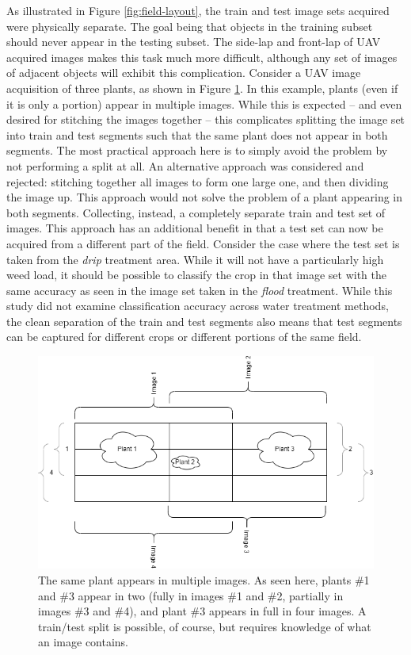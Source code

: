 \documentclass[letterpaper]{report}
\begin{document}
As illustrated in Figure \ref{fig:field-layout}, the train and test image sets acquired were physically separate. The goal being that objects in the training subset should never appear in the testing subset. The side-lap and front-lap of UAV acquired images makes this task much more difficult, although any set of images of adjacent objects will exhibit this complication. Consider a UAV image acquisition of three plants, as shown in Figure \ref{fig:uav-overlap}. In this example, plants (even if it is only a portion) appear in multiple images. While this is expected -- and even desired for stitching the images together -- this complicates splitting the image set into train and test segments such that the same plant does not appear in both segments. The most practical approach here is to simply avoid the problem by not performing a split at all. An alternative approach was considered and rejected: stitching together all images to form one large one, and then dividing the image up. This approach would not solve the problem of a plant appearing in both segments. Collecting, instead, a completely separate train and test set of images. This approach has an additional benefit in that a test set can now be acquired from a different part of the field. Consider the case where the test set is taken from the \textit{drip} treatment area. While it will not have a particularly high weed load, it should be possible to classify the crop in that image set with the same accuracy as seen in the image set taken in the \textit{flood} treatment. While this study did not examine classification accuracy across water treatment methods, the clean separation of the train and test segments also means that test segments can be captured for different crops or different portions of the same field.

\begin{figure}[h!]
	\centering
	\includegraphics[width=0.5\linewidth]{./figures/overlap.png}
	\caption[Image overlap in UAV images]{The same plant appears in multiple images. As seen here, plants \#1 and \#3 appear in two (fully in images \#1 and \#2, partially in images \#3 and \#4), and plant \#3 appears in full in four images. A train/test split is possible, of course, but requires knowledge of what an image contains.}
	\label{fig:uav-overlap}
\end{figure}
\end{document}
